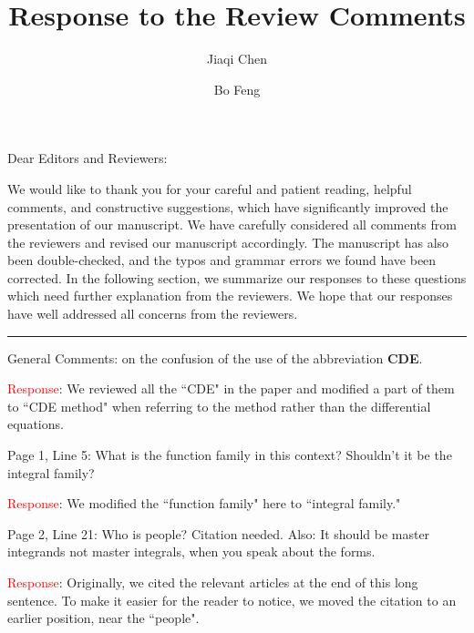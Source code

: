 \documentclass[12pt,superscriptaddress]{revtex4}
\begin{document}
	
	
	\title{Response to the Review Comments}
    \author{Jiaqi Chen}
    \author{Bo Feng}
	
	
	\maketitle

\noindent Dear Editors and Reviewers:
	
We would like to thank you for your careful and patient reading, helpful comments, and constructive suggestions, which have significantly improved the presentation of our manuscript. We have carefully considered all comments from the reviewers and revised our manuscript accordingly. The manuscript has also been double-checked, and the typos and grammar errors we found have been corrected. In the following section, we summarize our responses to these questions which need further explanation from the reviewers. We hope that our responses have well addressed all concerns from the reviewers.

\noindent\rule[0.25\baselineskip]{\textwidth}{1pt}



\begin{center}
{
	\parbox{1\linewidth}
	{General Comments: on the confusion of the use of the abbreviation \textbf{CDE}.}
}
\end{center}
\noindent\textcolor{red}{Response}:
We reviewed all the ``CDE" in the paper and modified a part of them to ``CDE method" when referring to the method rather than the differential equations.



\begin{center}
{
\parbox{1\linewidth}
{Page 1, Line 5: What is the function family in this context? Shouldn’t it be the integral family?}
}
\end{center}
\noindent\textcolor{red}{Response}:
We modified the ``function family" here to ``integral family."




\begin{center}
{
	\parbox{1\linewidth}
	{		
Page 2, Line 21: Who is people? Citation needed. Also: It should
be master integrands not master integrals, when you speak about the forms.
	}
}
\end{center}
\noindent\textcolor{red}{Response}:
Originally, we cited the relevant articles at the end of this long sentence. To make it easier for the reader to notice, we moved the citation to an earlier position, near the ``people".
\end{document}
